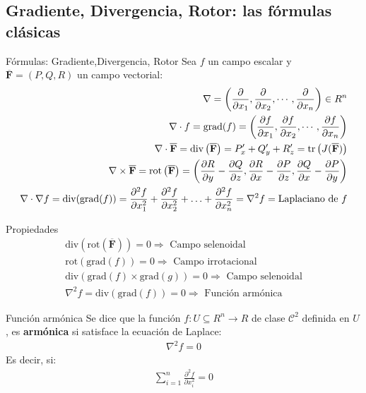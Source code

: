 \documentclass[a4paper, twoside]{article}
\numberwithin{equation}{section}
\numberwithin{figure}{section}
\numberwithin{table}{section}
\newcommand{\vect}[1]{\overline{\textbf{#1}}}
\begin{document}
\subsection{Gradiente, Divergencia, Rotor: las fórmulas clásicas}
\begin{definicion*}{Fórmulas: Gradiente,Divergencia, Rotor}
	Sea $f$ un campo escalar y $\vect{F}=(P,Q,R)$ un campo vectorial:
	\begin{align}
		\nabla = \left(\frac{\partial}{\partial x_1}, \frac{\partial}{\partial x_2}, \cdots, \frac{\partial}{\partial x_n}\right) \in R^n \\
		\nabla \cdot f = \text{grad}(f) = \left(\frac{\partial f}{\partial x_1}, \frac{\partial f}{\partial x_2}, \cdots, \frac{\partial f}{\partial x_n}\right) \\
		\nabla \cdot \vect{F} = \text{div} \left(\vect{F}\right) = P_x^\prime + Q_y^\prime + R_z^\prime = \text{tr} \left(J(\vect{F})\right) \\
		\nabla \times \vect{F} = \text{rot} \left(\vect{F}\right) = \left(\frac{\partial R}{\partial y} - \frac{\partial Q}{\partial z}, \frac{\partial R}{\partial x} - \frac{\partial P}{\partial z}, \frac{\partial Q}{\partial x} - \frac{\partial P}{\partial y}\right) \\
		\nabla \cdot \nabla f = \text{div}(\text{grad}(f)) = \frac{\partial^2 f}{\partial x_1^2} + \frac{\partial^2 f}{\partial x_2^2} + \ldots + \frac{\partial^2 f}{\partial x_n^2} = \nabla^2 f = \text{Laplaciano de \ensuremath{f}}
	\end{align}
\end{definicion*}

\begin{corolario*}{Propiedades}
	\begin{align}
		\text{div}(\text{rot}(\vect{F}))=0 \Rightarrow \text{ Campo selenoidal} \\
		\text{rot}(\text{grad}(f))=0 \Rightarrow \text{ Campo irrotacional} \\
		\text{div}(\text{grad}(f)\times \text{grad}(g))=0 \Rightarrow \text{ Campo selenoidal} \\
		\nabla^2 f=\text{div}(\text{grad}(f))=0 \Rightarrow \text{ Función armónica}
	\end{align}
\end{corolario*}

\begin{definicion*}{Función armónica}
	Se dice que la función $f: U \subseteq R^n \to R$ de clase $\mathcal{C}^2$ definida en $U$, es \textbf{armónica} si satisface la ecuación de Laplace:
	\begin{align}
		\nabla^{2}f=0
	\end{align}
	Es decir, si:
	\begin{align}
		\sum_{i=1}^{n}\frac{\partial^2 f}{\partial x_i^{2}}=0
	\end{align}
\end{definicion*}
\end{document}
